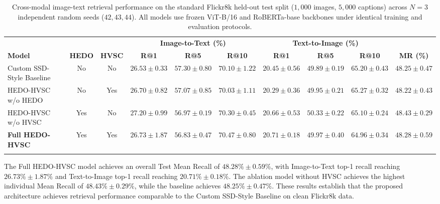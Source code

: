 \documentclass[pdflatex,sn-mathphys-num]{sn-jnl}%
\begin{document}
\begin{table}
\centering
\caption{Cross-modal image-text retrieval performance on the standard Flickr8k held-out test split ($1{,}000$ images, $5{,}000$ captions) across $N=3$ independent random seeds ($42, 43, 44$). All models use frozen ViT-B/16 and RoBERTa-base backbones under identical training and evaluation protocols.}
\label{tab:main_results}
\footnotesize
\setlength{\tabcolsep}{2.2pt}
\begin{tabular*}{\textheight}{@{\extracolsep\fill}lccccccccc@{}}
\toprule
& & & \multicolumn{3}{c}{\textbf{Image-to-Text (\%)}} & \multicolumn{3}{c}{\textbf{Text-to-Image (\%)}} & \\
\cmidrule{4-6}\cmidrule{7-9}
\textbf{Model} & \textbf{HEDO} & \textbf{HVSC} & \textbf{R@1} & \textbf{R@5} & \textbf{R@10} & \textbf{R@1} & \textbf{R@5} & \textbf{R@10} & \textbf{MR (\%)} \\
\midrule
Custom SSD-Style Baseline & No & No & $26.53 {\pm} 0.33$ & $57.30 {\pm} 0.80$ & $70.10 {\pm} 1.22$ & $20.45 {\pm} 0.56$ & $49.89 {\pm} 0.19$ & $65.20 {\pm} 0.43$ & $48.25 {\pm} 0.47$ \\
HEDO-HVSC w/o HEDO & No & Yes & $26.70 {\pm} 0.82$ & $57.07 {\pm} 0.85$ & $70.03 {\pm} 1.11$ & $20.29 {\pm} 0.36$ & $49.95 {\pm} 0.21$ & $65.27 {\pm} 0.32$ & $48.22 {\pm} 0.43$ \\
HEDO-HVSC w/o HVSC & Yes & No & $\mathbf{27.20 {\pm} 0.99}$ & $56.97 {\pm} 0.19$ & $70.30 {\pm} 0.45$ & $20.66 {\pm} 0.53$ & $\mathbf{50.33 {\pm} 0.22}$ & $65.10 {\pm} 0.24$ & $\mathbf{48.43 {\pm} 0.29}$ \\
\textbf{Full HEDO-HVSC} & Yes & Yes & $26.73 {\pm} 1.87$ & $\mathbf{56.83 {\pm} 0.47}$ & $\mathbf{70.47 {\pm} 0.80}$ & $\mathbf{20.71 {\pm} 0.18}$ & $49.97 {\pm} 0.40$ & $\mathbf{64.96 {\pm} 0.34}$ & $\mathbf{48.28 {\pm} 0.59}$ \\
\botrule
\end{tabular*}
\end{table}

The Full HEDO-HVSC model achieves an overall Test Mean Recall of $48.28\% \pm 0.59\%$, with Image-to-Text top-1 recall reaching $26.73\% \pm 1.87\%$ and Text-to-Image top-1 recall reaching $20.71\% \pm 0.18\%$. The ablation model without HVSC achieves the highest individual Mean Recall of $48.43\% \pm 0.29\%$, while the baseline achieves $48.25\% \pm 0.47\%$. These results establish that the proposed architecture achieves retrieval performance comparable to the Custom SSD-Style Baseline on clean Flickr8k data.
\end{document}
